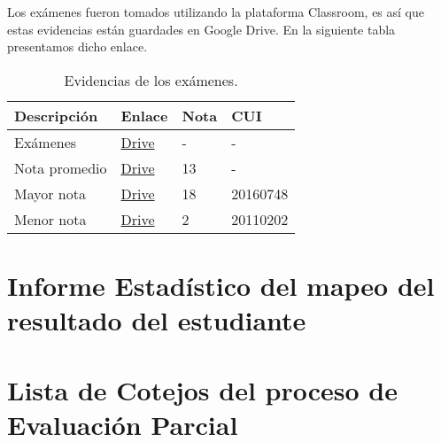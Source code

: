 \begin{flushleft}
	Los exámenes fueron tomados utilizando la plataforma Classroom, es así que estas evidencias están guardades en Google Drive. En la siguiente tabla presentamos dicho enlace.	
\end{flushleft}

\begin{table}[H]
	\centering
	\caption{Evidencias de los exámenes.}
	\begin{tabular}{|x{5cm}|x{2cm}|x{2cm}|x{3cm}|}
		\hline 
		\textbf{Descripción} & \textbf{Enlace} & \textbf{Nota} & \textbf{CUI} \\ \hline
		Exámenes & \href{https://docs.google.com/spreadsheets/d/1U4FTuQ_VT6xVcLQ_-JSvKlBPD5V_XOCM7DuyN5GfrUs/edit?usp=sharing}{Drive} & - & - \\  \hline		
		Nota promedio & \href{https://docs.google.com/spreadsheets/d/1U4FTuQ_VT6xVcLQ_-JSvKlBPD5V_XOCM7DuyN5GfrUs/edit?usp=sharing}{Drive} & 13 & - \\  \hline
		Mayor nota & \href{https://docs.google.com/spreadsheets/d/1U4FTuQ_VT6xVcLQ_-JSvKlBPD5V_XOCM7DuyN5GfrUs/edit?usp=sharing}{Drive} & 18 & 20160748 \\  \hline
		Menor nota & \href{https://docs.google.com/spreadsheets/d/1U4FTuQ_VT6xVcLQ_-JSvKlBPD5V_XOCM7DuyN5GfrUs/edit?usp=sharing}{Drive} & 2 & 20110202 \\  \hline
	\end{tabular}
\end{table}


\clearpage
{}
\vspace*{\fill}
{\centering
\section{Informe Estadístico del mapeo del resultado del estudiante}}
\vspace*{\fill}


\clearpage
{}
\vspace*{\fill}
{\centering
	\section{Lista de Cotejos del proceso de Evaluación Parcial}}
\vspace*{\fill}


